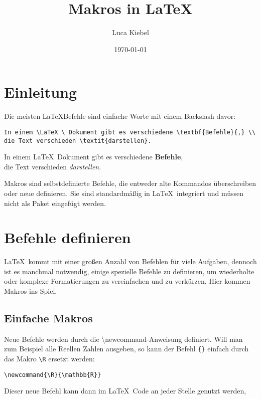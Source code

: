 \documentclass[ngerman,12pt,titlepage]{scrartcl}
\title{Makros in \LaTeX}
\author{Luca Kiebel}
\date{\today}
\newenvironment{hlbox}{\begin{tcolorbox}[enhanced,colback=white,colframe=white,sharpish corners,fuzzy halo=0.5mm with lightgray]}{\end{tcolorbox}}
\begin{document}
\maketitle
\newpage
	\tableofcontents
\newpage

\section{Einleitung}
Die meisten \LaTeX Befehle sind einfache Worte mit einem Backslash davor:

\begin{lstlisting}
In einem \LaTeX \ Dokument gibt es verschiedene \textbf{Befehle}{,} \\
die Text verschieden \textit{darstellen}.
\end{lstlisting} 
\begin{hlbox}
In einem \LaTeX \ Dokument gibt es verschiedene \textbf{Befehle}{,} \\
die Text verschieden \textit{darstellen}.
\end{hlbox}
Makros sind selbstdefinierte Befehle, die entweder alte Kommandos überschreiben oder neue definieren.
Sie sind standardmäßig in \LaTeX \ integriert und müssen nicht als Paket eingefügt werden. 

\section{Befehle definieren}

\LaTeX \ kommt mit einer großen Anzahl von Befehlen für viele Aufgaben, dennoch ist es manchmal notwendig, einige spezielle Befehle zu definieren, um wiederholte oder komplexe Formatierungen zu vereinfachen und zu verkürzen. Hier kommen Makros ins Spiel.

\subsection{Einfache Makros}
Neue Befehle werden durch die {\textbackslash}newcommand-Anweisung definiert. Will man zum Beispiel alle Reellen Zahlen ausgeben{,} so kann der Befehl \lstinline|{}| einfach durch das Makro \lstinline|\R| ersetzt werden:
\begin{lstlisting}
\newcommand{\R}{\mathbb{R}}
\end{lstlisting}

Dieser neue Befehl kann dann im \LaTeX \ Code an jeder Stelle genutzt werden{,} $  $
\newpage
\printbibliography
\end{document}
